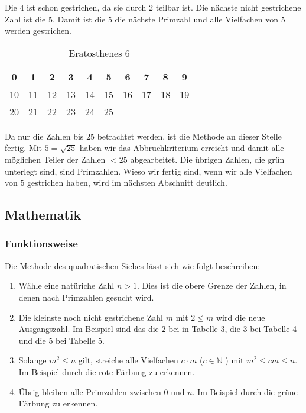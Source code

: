 	\noindent Die $4$ ist schon gestrichen, da sie durch $2$ teilbar ist. Die n\"achste nicht gestrichene Zahl ist die $5$. Damit ist die $5$ die n\"achste Primzahl und alle Vielfachen von $5$ werden gestrichen.
	
	\begin{table}[!ht] 
		\centering
		\begin{tabular}{|c|c|c|c|c|c|c|c|c|c|}
			\hline	 		 			
			\cellcolor{red}0  & \cellcolor{red} 1 &  \cellcolor{green}2 &  \cellcolor{green}3 & \cellcolor{red}4 &  \cellcolor{green}5 & \cellcolor{red} 6 &  \cellcolor{green}7 & \cellcolor{red} 8 &  \cellcolor{red}9 \\
			\hline
			\cellcolor{red}10 & \cellcolor{green}11 & \cellcolor{red}12 & \cellcolor{green}13 & \cellcolor{red}14 & \cellcolor{red}15 & \cellcolor{red}16 & \cellcolor{green}17 & \cellcolor{red}18 & \cellcolor{green}19 \\
			\hline
			\cellcolor{red}20 & \cellcolor{red}21 & \cellcolor{red}22 & \cellcolor{green}23 & \cellcolor{red}24 & \cellcolor{red}25 &  &  &  &  \\
			\hline
		\end{tabular}
		\caption{Eratosthenes 6}
		\label{tab:eratosthenes6}			
	\end{table}
	
	\noindent Da nur die Zahlen bis $25$ betrachtet werden, ist die Methode an dieser Stelle fertig. Mit $5=\sqrt{25}$ haben wir das Abbruchkriterium erreicht und damit alle m\"oglichen Teiler der Zahlen $<25$ abgearbeitet. Die \"ubrigen Zahlen, die gr\"un unterlegt sind, sind Primzahlen. Wieso wir fertig sind, wenn wir alle Vielfachen von $5$ gestrichen haben, wird im n\"achsten Abschnitt deutlich.
	
	\subsection{Mathematik}
	\subsubsection{Funktionsweise}
	Die Methode des quadratischen Siebes l\"asst sich wie folgt beschreiben:
	\begin{enumerate}
		
		\item W\"ahle eine nat\"uriche Zahl $n > 1$. Dies ist die obere Grenze der Zahlen, in denen nach Primzahlen gesucht wird.
		\item Die kleinste noch nicht gestrichene Zahl $m$ mit $2 \leq m$ wird die neue Ausgangszahl. Im Beispiel sind das die $2$ bei in Tabelle 3, die $3$ bei Tabelle 4 und die $5$ bei Tabelle 5.
		\item Solange $m^2 \leq n$ gilt, streiche alle Vielfachen $c\cdot m$ ($c \in \mathbb{N} $ ) mit $m^2 \leq cm \leq n$. Im Beispiel durch die rote F\"arbung zu erkennen.
		\item \"Ubrig bleiben alle Primzahlen zwischen $0$ und $n$. Im Beispiel durch die gr\"une F\"arbung zu erkennen.
	\end{enumerate}
	

